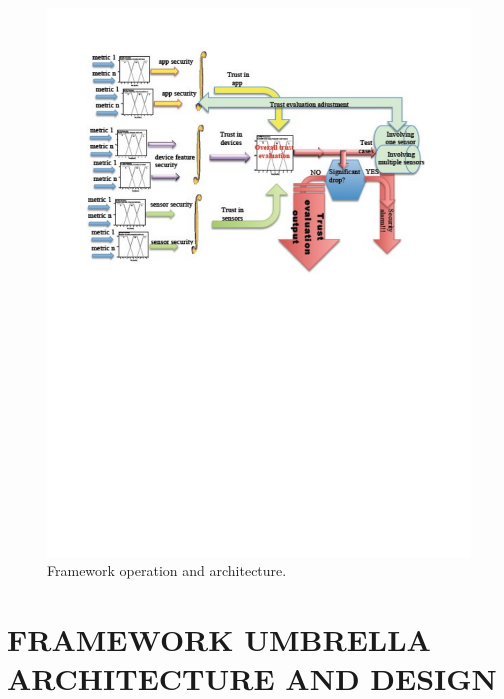 \begin{figure}[ht]
\centering
\includegraphics[width=5in]{umbrella_framework.pdf}
\caption{Framework operation and architecture.}
\label{fig:umbrella}
\end{figure}

\section{FRAMEWORK UMBRELLA ARCHITECTURE AND DESIGN}

